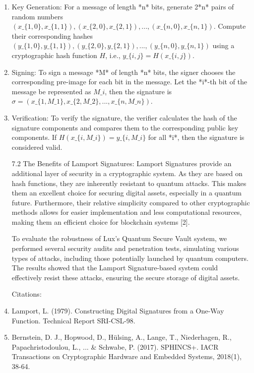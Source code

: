 \documentclass[11pt]{article}
\begin{document}
\begin{enumerate}
  \item Key Generation: For a message of length *n* bits, generate 2*n* pairs of random numbers \((x\_\{1,0\}, x\_\{1,1\}), (x\_\{2,0\}, x\_\{2,1\}), ... , (x\_\{n,0\}, x\_\{n,1\})\). Compute their corresponding hashes \((y\_\{1,0\}, y\_\{1,1\}), (y\_\{2,0\}, y\_\{2,1\}), ... , (y\_\{n,0\}, y\_\{n,1\})\) using a cryptographic hash function \(H\), i.e., \(y\_\{i,j\} = H(x\_\{i,j\})\).
  \item Signing: To sign a message *M* of length *n* bits, the signer chooses the corresponding pre-image for each bit in the message. Let the *i*-th bit of the message be represented as \(M\_i\), then the signature is \(\sigma = (x\_\{1, M\_1\}, x\_\{2, M\_2\}, ... , x\_\{n, M\_n\})\).
  \item Verification: To verify the signature, the verifier calculates the hash of the signature components and compares them to the corresponding public key components. If \(H(x\_\{i, M\_i\}) = y\_\{i, M\_i\}\) for all *i*, then the signature is considered valid.

7.2 The Benefits of Lamport Signatures: Lamport Signatures provide an additional layer of security in a cryptographic system. As they are based on hash functions, they are inherently resistant to quantum attacks. This makes them an excellent choice for securing digital assets, especially in a quantum future. Furthermore, their relative simplicity compared to other cryptographic methods allows for easier implementation and less computational resources, making them an efficient choice for blockchain systems [2].


To evaluate the robustness of Lux's Quantum Secure Vault system, we performed several security audits and penetration tests, simulating various types of attacks, including those potentially launched by quantum computers. The results showed that the Lamport Signature-based system could effectively resist these attacks, ensuring the secure storage of digital assets.


Citations:

  \item Lamport, L. (1979). Constructing Digital Signatures from a One-Way Function. Technical Report SRI-CSL-98.
  \item Bernstein, D. J., Hopwood, D., Hülsing, A., Lange, T., Niederhagen, R., Papachristodoulou, L., ... \& Schwabe, P. (2017). SPHINCS+. IACR Transactions on Cryptographic Hardware and Embedded Systems, 2018(1), 38-64.
\end{enumerate}
\end{document}
